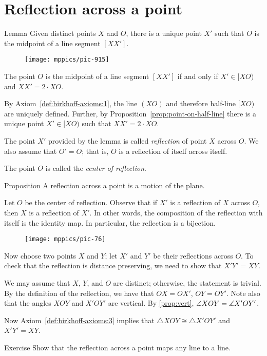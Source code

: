 \section{Reflection across a point}

\begin{thm}[\abs]{Lemma}\label{lem:point-reflection}
Given distinct points $X$ and $O$, there is a unique point $X'$ such that $O$ is the midpoint of a line segment $[XX']$.
\end{thm}

\begin{wrapfigure}{o}{33mm}
\vskip-0mm
\centering
\texttt{[image: mppics/pic-915]}
\end{wrapfigure}

The point $O$ is the midpoint of a line segment $[XX']$ if and only if $X'\in [XO)$ and $XX'=2\cdot XO$.

By Axiom~\ref{def:birkhoff-axioms:1}, the line $(XO)$ and therefore half-line $[XO)$ are uniquely defined.
Further, by Proposition~\ref{prop:point-on-half-line} there is a unique point $X'\in [XO)$ such that $XX'=2\cdot XO$.
\qeds

The point $X'$ provided by the lemma is called \emph{reflection} of point $X$ across $O$.
We also assume that $O'=O$; that is, $O$ is a reflection of itself across itself.

The point $O$ is called the \emph{center of reflection}.

\begin{thm}[\abs]{Proposition}\label{prop:point-reflection}
A reflection across a point is a motion of the plane.
\end{thm}

Let $O$ be the center of reflection.
Observe that if $X'$ is a reflection of $X$ across $O$,
then $X$ is a reflection of $X'$.
In other words, the composition of the reflection with itself is the identity map.
In particular, the reflection is a bijection.

\begin{wrapfigure}{o}{33mm}
\vskip-6mm
\centering
\texttt{[image: mppics/pic-76]}
\end{wrapfigure}

Now choose two points $X$ and $Y$;
let $X'$ and $Y'$ be their reflections across $O$.
To check that the reflection is distance preserving, we need to show that $X'Y'=XY$.

We may assume that $X$, $Y$, and $O$ are distinct; otherwise, the statement is trivial.
By the definition of the reflection, we have that $OX=OX'$, $OY=OY'$.
Note also that the angles $XOY$ and $X'OY'$ are vertical.
By \ref{prop:vert}, $\measuredangle XOY=\measuredangle X'OY'$.

Now Axiom~\ref{def:birkhoff-axioms:3} implies that $\triangle XOY\cong\triangle X'OY'$ and $X'Y'=XY$.
\qeds

\begin{thm}{Exercise}\label{ex:refelection-of-line}
Show that the reflection across a point maps any line to a line.
\end{thm}
